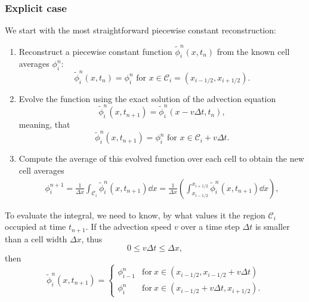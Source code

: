 \documentclass[../thesis.tex]{subfiles}
\begin{document}
\subsubsection{Explicit case}
We start with the most straightforward piecewise constant reconstruction:
\begin{enumerate}
    \item Reconstruct a piecewise constant function \(\tilde{\phi}_{i}^{n}(x,t_n)\) from the known cell averages \(\phi_{i}^{n}\):
    \[
        \tilde{\phi}_{i}^{n}(x,t_n)
        = \phi_{i}^{n} \text{ for } x \in \mathcal{C}_{i} = (x_{i-1/2},x_{i+1/2}).
    \]
    \item Evolve the function using the exact solution of the advection equation
    \[
        \tilde{\phi}_{i}^{n}(x,t_{n+1}) = \tilde{\phi}_{i}^{n}(x - v\Delta t,t_{n}),
    \]
    meaning, that
    \[
        \tilde{\phi}_{i}^{n}(x,t_{n+1})
        = \phi_{i}^{n} \text{ for } x \in \mathcal{C}_{i} + v\Delta t.\]
    \item Compute the average of this evolved function over each cell to obtain the new cell averages
    \begin{equation*}
        \begin{split}
            \phi_{i}^{n+1}
            = \frac{1}{\Delta x}\int_{\mathcal{C}_i}\tilde{\phi}_{i}^{n}(x,t_{n+1}) \dd{x}= \frac{1}{\Delta x}\left(
                \int_{x_{i-1/2}}^{x_{i+1/2}}\tilde{\phi}_{i}^{n}(x,t_{n+1}) \dd{x}
                \right),
        \end{split}
    \end{equation*}
\end{enumerate}
To evaluate the integral, we need to know, by what values it the region \(\mathcal{C}_{i}\) occupied at time \(t_{n+1}\).
If the advection speed \(v\) over a time step \(\Delta t\) is smaller than a cell width \(\Delta x\), thus
\begin{equation}
    0 \leq v\Delta t \leq \Delta x,
\end{equation}
then
\begin{equation}
    \tilde{\phi}_{i}^{n}(x,t_{n+1}) =
    \begin{cases}
        \phi_{i-1}^{n} & \text{for}\ x \in (x_{i-1/2},x_{i-1/2} + v\Delta t)
        \\
        \phi_{i}^{n} & \text{for}\ x \in (x_{i-1/2} + v\Delta t,x_{i+1/2}).
    \end{cases}
\end{equation}
\end{document}
